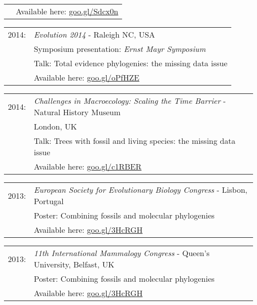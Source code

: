 \documentclass[10pt,a4paper]{article}
\begin{document}
{\begin{tabular}{ll}
      & Available here: \href{http://figshare.com/articles/Trees_with_fossil_and_living_species_the_data_issue/1056307}{goo.gl/Sdcx0n}\\
\end{tabular}
\begin{tabular}{ll}
2014: & \textit{Evolution 2014} - Raleigh NC, USA\\
      & Symposium presentation: \textit{Ernst Mayr Symposium} \\
      & Talk: Total evidence phylogenies: the missing data issue\\
      & Available here: \href{http://figshare.com/articles/Total_evidence_phylogenies_the_missing_data_issue/1086216}{goo.gl/oPfHZE}\\
\end{tabular}
\begin{tabular}{ll}
2014: & \textit{Challenges in Macroecology: Scaling the Time Barrier} - Natural History Museum \\
      & London, UK\\
      & Talk: Trees with fossil and living species: the missing data issue\\
      & Available here: \href{http://figshare.com/articles/Trees_with_fossil_and_living_species_the_data_issue/1056307}{goo.gl/c1RBER}\\
\end{tabular}
\begin{tabular}{ll}
2013: & \textit{European Society for Evolutionary Biology Congress} - Lisbon, Portugal\\
      & Poster: Combining fossils and molecular phylogenies\\
      & Available here: \href{http://figshare.com/articles/Combining_fossils_and_molecular_phylogenies/1056300}{goo.gl/3HcRGH}\\
\end{tabular}
\begin{tabular}{ll}
2013: & \textit{11th International Mammalogy Congress} - Queen's University, Belfast, UK \\
      & Poster: Combining fossils and molecular phylogenies\\
      & Available here: \href{http://figshare.com/articles/Combining_fossils_and_molecular_phylogenies/1056300}{goo.gl/3HcRGH}\\
\end{tabular}
\bigskip

}
\end{document}
